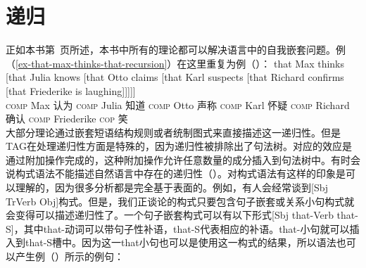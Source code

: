 \section{递归}
\label{sec-recursion}

正如本书第~\pageref{ex-that-max-thinks-that-recursion}页所述，本书中所有的理论都可以解决语言中的自我嵌套问题。例（\ref{ex-that-max-thinks-that-recursion}）在这里重复为例（）：
\ea
\label{ex-that-max-thinks-that-recursion-two}
\gll that Max thinks [that Julia knows [that Otto claims [that Karl suspects [that Richard confirms [that Friederike is laughing]]]]]\\
	\textsc{comp} Max 认为 \spacebr\textsc{comp} Julia 知道 \spacebr\textsc{comp} Otto 声称 \spacebr\textsc{comp} Karl 怀疑 \spacebr\textsc{comp} Richard 确认 \spacebr\textsc{comp} Friederike \textsc{cop} 笑\\
\z
大部分理论通过嵌套短语结构规则或者统制图式来直接描述这一递归性。但是TAG\indextagc 在处理递归性方面是特殊的，因为递归性被排除出了句法树。对应的效应是通过附加操作完成的，这种附加操作允许任意数量的成分插入到句法树中。有时会说构式语法\indexcxgc 不能描述自然语言中存在的递归性（\egc \citealp[]{Leiss2009a}）。对构式语法有这样的印象是可以理解的，因为很多分析都是完全基于表面的。例如，有人会经常谈到[Sbj TrVerb Obj]构式。但是，我们正谈论的构式只要包含句子嵌套或关系小句构式就会变得可以描述递归性了。一个句子嵌套构式可以有以下形式[Sbj that-Verb that-S]，其中that-动词可以带句子性补语，that-S代表相应的补语。that-小句就可以插入到that-S槽中。因为这一that小句也可以是使用这一构式的结果，所以语法也可以产生例（）所示的例句：
